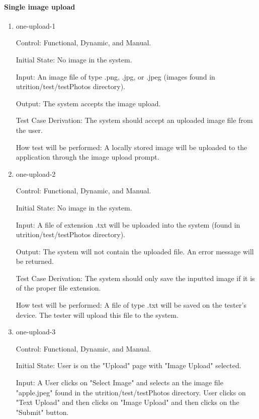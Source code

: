 \documentclass[12pt, titlepage]{article}
\begin{document}
	\paragraph{Single image upload}
	
	\begin{enumerate}
		
		\item{one-upload-1\\}
		
		Control: Functional, Dynamic, and Manual.
		
		Initial State: No image in the system.
		
		Input: An image file of type .png, .jpg, or .jpeg (images found in utrition/test/testPhotos directory).
		
		Output: The system accepts the image upload.
		
		Test Case Derivation: The system should accept an uploaded image file from the user.
		
		How test will be performed: A locally stored image will be uploaded to 
		the application through the image upload prompt.
		
		\item{one-upload-2\\}
		
		Control: Functional, Dynamic, and Manual.
		
		Initial State: No image in the system.
		
		Input: A file of extension .txt will be uploaded into the system (found in utrition/test/testPhotos directory).
		
		Output: The system will not contain the uploaded file. An error message 
		will be returned.
		
		Test Case Derivation: The system should only save the inputted image if 
		it is of the proper file extension.
		
		How test will be performed: A file of type .txt will be saved on the 
		tester's device. The tester will upload this file to the system.
		
		\item{one-upload-3\\}
		
		Control: Functional, Dynamic, and Manual.
		
		Initial State: User is on the "Upload" page with "Image Upload" selected.
		
		Input: A User clicks on "Select Image" and selects an the image file "apple.jpeg" found in the utrition/test/testPhotos directory. User clicks on "Text Upload" and then clicks on "Image Upload" and then clicks on the "Submit" button.
		

\end{enumerate}
\end{document}
